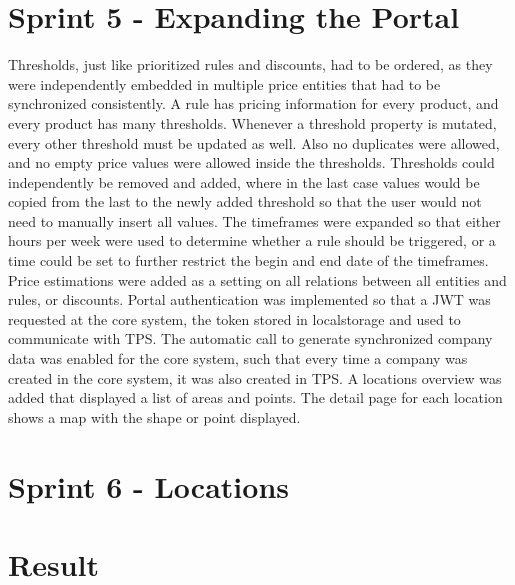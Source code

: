 \section{Sprint 5 - Expanding the Portal}
Thresholds, just like prioritized rules and discounts, had to be ordered, as they were independently embedded in multiple price entities that had to be synchronized consistently. A rule has pricing information for every product, and every product has many thresholds. Whenever a threshold property is mutated, every other threshold must be updated as well. Also no duplicates were allowed, and no empty price values were allowed inside the thresholds. Thresholds could independently be removed and added, where in the last case values would be copied from the last to the newly added threshold so that the user would not need to manually insert all values. The timeframes were expanded so that either hours per week were used to determine whether a rule should be triggered, or a time could be set to further restrict the begin and end date of the timeframes. Price estimations were added as a setting on all relations between all entities and rules, or discounts. Portal authentication was implemented so that a JWT was requested at the core system, the token stored in localstorage and used to communicate with TPS. The automatic call to generate synchronized company data was enabled for the core system, such that every time a company was created in the core system, it was also created in TPS. A locations overview was added that displayed a list of areas and points. The detail page for each location shows a map with the shape or point displayed.

%
\section{Sprint 6 - Locations}

%
\section{Result}
